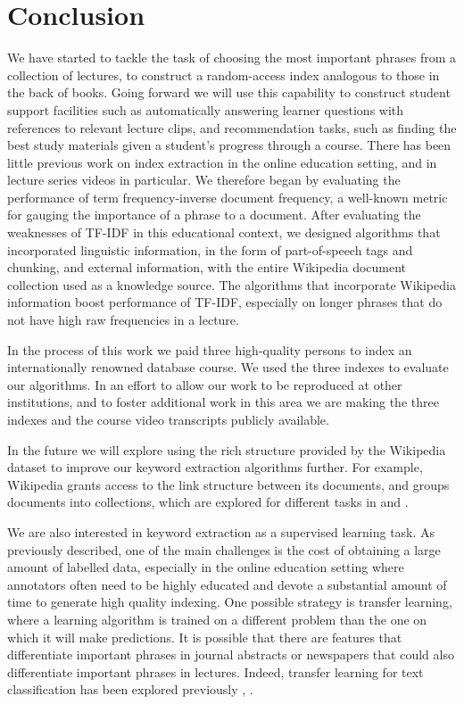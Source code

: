 \section{Conclusion}
\label{sec:conclusion}

We have started to tackle the task of choosing the most important
phrases from a collection of lectures, to construct a random-access
index analogous to those in the back of books.  Going forward we will
use this capability to construct student support facilities such as
automatically answering learner questions with references to relevant
lecture clips, and recommendation tasks, such as finding the best
study materials given a student's progress through a course. There has
been little previous work on index extraction in the online education
setting, and in lecture series videos in particular. We therefore
began by evaluating the performance of term frequency-inverse document
frequency, a well-known metric for gauging the importance of a phrase
to a document. After evaluating the weaknesses of TF-IDF in this
educational context, we designed algorithms that incorporated
linguistic information, in the form of part-of-speech tags and
chunking, and external information, with the entire Wikipedia document
collection used as a knowledge source. The algorithms that incorporate
Wikipedia information boost performance of TF-IDF, especially on
longer phrases that do not have high raw frequencies in a lecture.

In the process of this work we paid three high-quality persons to
index an internationally renowned database course. We used the three
indexes to evaluate our algorithms. In an effort to allow our work to
be reproduced at other institutions, and to foster additional work in
this area we are making the three indexes and the course video
transcripts publicly available.

In the future we will explore using the rich structure provided by
the Wikipedia dataset to improve our keyword extraction
algorithms further. For example, Wikipedia grants access to the link structure
between its documents, and groups documents into collections, which are
explored for different tasks in \cite{hu2009exploiting} and \cite{milne2007computing}.

We are also interested in keyword extraction as a supervised learning
task. As previously described, one of the main challenges is the cost
of obtaining a large amount of labelled data, especially in the online
education setting where annotators often need to be highly educated
and devote a substantial amount of time to generate high quality
indexing. One possible strategy is transfer learning, where a learning
algorithm is trained on a different problem than the one on which it
will make predictions. It is possible that there are features that
differentiate important phrases in journal abstracts or newspapers
that could also differentiate important phrases in lectures. Indeed,
transfer learning for text classification has been explored previously
\cite{raina2006constructing}, \cite{do2005transfer}.

